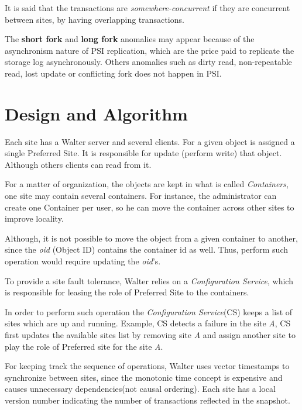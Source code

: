 \documentclass[a4paper]{article}
\begin{document}
It is said that the transactions are \textit{somewhere-concurrent} if they are concurrent between sites, by having overlapping transactions.

The \textbf{short fork} and \textbf{long fork} anomalies may appear because of the asynchronism nature of PSI replication, which are the price paid to replicate the storage log asynchronously. Others anomalies such as dirty read, non-repeatable read, lost update or conflicting fork does not happen in PSI. 


\section{Design and Algorithm}

Each site has a Walter server and several clients. For a given object is assigned a single Preferred Site. It is responsible for update (perform write) that object. Although others clients can read from it.

For a matter of organization, the objects are kept in what is called \emph{Containers}, one site may contain several containers. For instance, the administrator can create one Container per user, so he can move the container across other sites to improve locality. 

Although, it is not possible to move the object from a given container to another, since the \textit{oid} (Object ID) contains the container id as well. Thus, perform such operation would require updating the \textit{oid}'s. 

To provide a site fault tolerance, Walter relies on a \textit{Configuration Service}, which is responsible for leasing the role of Preferred Site to the containers. 

In order to perform such operation the \emph{Configuration Service}(CS) keeps a list of sites which are up and running. Example, CS detects a failure in the site \emph{A}, CS first updates the available sites list by removing site \emph{A} and assign another site to play the role of Preferred site for the site \emph{A}. 

For keeping track the sequence of operations, Walter uses vector timestamps to synchronize between sites, since the monotonic time concept is expensive and causes unnecessary dependencies(not causal ordering). Each site has a local version number indicating the number of transactions reflected in the snapshot.
\end{document}
